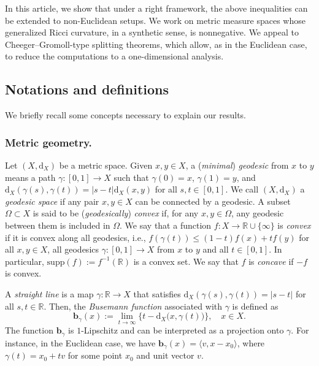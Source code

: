 \documentclass[sts]{imsart}
\theoremstyle{definition}
\theoremstyle{remark}
\newcommand{\R}{\mathbb{R}}
\newcommand{\bb}{\mathbf{b}}
\newcommand{\dist}{\mathrm{d}}
\newcommand{\lra}{\longrightarrow}
\newcommand{\supp}{\mathrm{supp}}
\begin{document}
In this article, we show that under a right framework, the above inequalities can be extended to non-Euclidean setups.
We work on metric measure spaces whose generalized Ricci curvature, in a synthetic sense, is nonnegative.
We appeal to Cheeger--Gromoll-type splitting theorems, which allow, as in the Euclidean case, to reduce the computations to a one-dimensional analysis. 

\subsection{Notations and definitions}%

We briefly recall some concepts necessary to explain our results.

\subsubsection{Metric geometry.}%

Let $(X,\dist_X)$ be a metric space.
Given $x,y\in X$, a (\emph{minimal}) \emph{geodesic} from $x$ to $y$ means a path $\gamma\colon [0,1]\lra X$ such that $\gamma(0)=x$, $\gamma(1)=y$, and $\dist_X(\gamma(s),\gamma(t))=|s-t|\dist_X(x,y)$ for all $s,t\in [0,1]$.
We call $(X,\dist_X)$ a \emph{geodesic space} if any pair $x,y\in X$ can be connected by a geodesic.
A subset $\Omega \subset X$ is said to be (\emph{geodesically}) \emph{convex} if, for any $x,y\in \Omega$, any geodesic between them is included in $\Omega$.
We say that a function $f\colon X\lra \R \cup \{\infty\}$ is \emph{convex} if it is convex along all geodesics, i.e., $f(\gamma(t))\leq (1-t)f(x)+tf(y)$ for all $x,y\in X$, all geodesics $\gamma\colon [0,1] \lra X$ from $x$ to $y$ and all $t\in [0,1]$.
In particular, $\supp(f):=f^{-1}(\R)$ is a convex set.
We say that $f$ is \emph{concave} if $-f$ is convex.

A \emph{straight line} is a map $\gamma\colon \R\lra X$ that satisfies $\dist_X(\gamma(s),\gamma(t))=|s-t|$ for all $s,t \in \R$.
Then, the \emph{Busemann function} associated with $\gamma$ is defined as
\begin{equation}\label{eq:Buse}
\bb_\gamma(x) :=\lim_{t\to\infty} \bigl\{ t-\dist_X \bigl( x,\gamma(t) \bigr) \bigr\}, \quad x \in X.
\end{equation}
The function $\bb_{\gamma}$ is $1$-Lipschitz and can be interpreted as a projection onto $\gamma$.
For instance, in the Euclidean case,  we have $\bb_\gamma(x)=\langle v,x-x_0 \rangle$, where $\gamma(t)=x_0+tv$ for some point $x_0$ and unit vector $v$.
\end{document}
